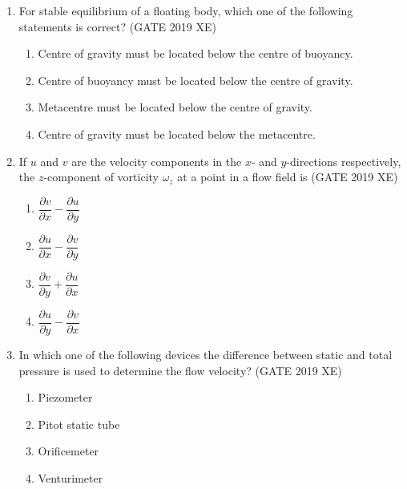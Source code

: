 \documentclass[journal,12pt,onecolumn]{IEEEtran}
\begin{document}
\begin{enumerate}
\item For stable equilibrium of a floating body, which one of the following statements is correct?
\hfill{(GATE 2019 XE)} \\
\begin{multicols}{2}
\begin{enumerate}
\item Centre of gravity must be located below the centre of buoyancy.
\item Centre of buoyancy must be located below the centre of gravity.
\item Metacentre must be located below the centre of gravity.
\item Centre of gravity must be located below the metacentre.
\end{enumerate}
\end{multicols}

\item If $u$ and $v$ are the velocity components in the $x$- and $y$-directions respectively, the $z$-component of vorticity $\omega_z$ at a point in a flow field is
\hfill{(GATE 2019 XE)} \\
\begin{multicols}{2}
\begin{enumerate}
\item $\dfrac{\partial v}{\partial x}-\dfrac{\partial u}{\partial y}$
\item $\dfrac{\partial u}{\partial x}-\dfrac{\partial v}{\partial y}$
\item $\dfrac{\partial v}{\partial y}+\dfrac{\partial u}{\partial x}$
\item $\dfrac{\partial u}{\partial y}-\dfrac{\partial v}{\partial x}$
\end{enumerate}
\end{multicols}


\item In which one of the following devices the difference between static and total pressure is used to determine the flow velocity?
\hfill{(GATE 2019 XE)} \\
\begin{multicols}{2}
\begin{enumerate}
\item Piezometer
\item Pitot static tube
\item Orificemeter
\item Venturimeter
\end{enumerate}
\end{multicols}


\end{enumerate}
\end{document}
